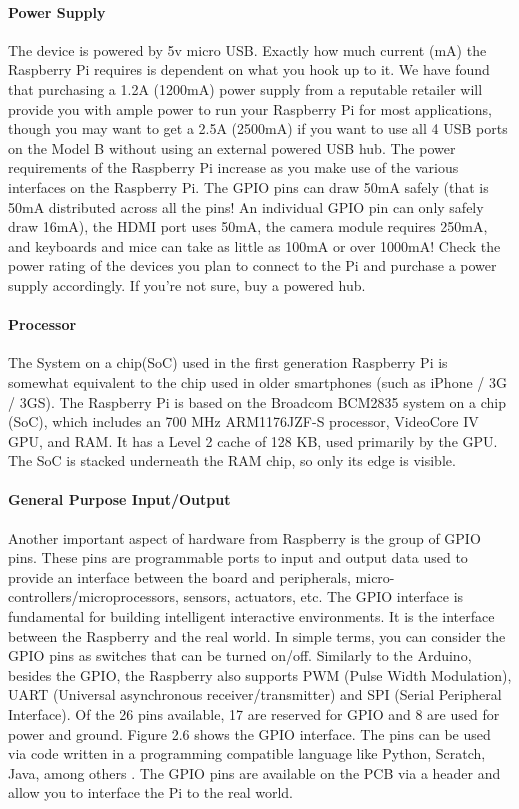\documentclass{acm_proc_article-sp}
\begin{document}
\paragraph{Power Supply}
The device is powered by 5v micro USB. Exactly how much current (mA) the Raspberry Pi requires is dependent on what you hook up to it. We have found that purchasing a 1.2A (1200mA) power supply from a reputable retailer will provide you with ample power to run your Raspberry Pi for most applications, though you may want to get a 2.5A (2500mA) if you want to use all 4 USB ports on the Model B without using an external powered USB hub.
\newline
\newline
The power requirements of the Raspberry Pi increase as you make use of the various interfaces on the Raspberry Pi. The GPIO pins can draw 50mA safely (that is 50mA distributed across all the pins! An individual GPIO pin can only safely draw 16mA), the HDMI port uses 50mA, the camera module requires 250mA, and keyboards and mice can take as little as 100mA or over 1000mA! Check the power rating of the devices you plan to connect to the Pi and purchase a power supply accordingly. If you’re not sure, buy a powered hub.

\paragraph{Processor}
The System on a chip(SoC) used in the first generation Raspberry Pi is somewhat equivalent to the chip used in older smartphones (such as iPhone / 3G / 3GS). The Raspberry Pi is based on the Broadcom BCM2835 system on a chip (SoC)\cite{Broadcom}, which includes an 700 MHz ARM1176JZF-S processor, VideoCore IV GPU\cite{Brose}, and RAM. It has a Level 2 cache of 128 KB, used primarily by the GPU. The SoC is stacked underneath the RAM chip, so only its edge is visible.

\paragraph{General Purpose Input/Output}
Another important aspect of hardware from Raspberry is the group of GPIO pins. These pins are programmable ports to input and output data used to provide an interface between the board and peripherals, micro-controllers/microprocessors, sensors, actuators, etc. The GPIO interface is fundamental for building intelligent interactive environments. It is the interface between the Raspberry and the real world. In simple terms, you can consider the GPIO pins as switches that can be turned on/off.
\newline
\newline
Similarly to the Arduino, besides the GPIO, the Raspberry also supports PWM (Pulse Width Modulation), UART (Universal asynchronous receiver/transmitter) and SPI (Serial Peripheral Interface). Of the 26 pins available, 17 are reserved for GPIO and 8 are used for power and ground. Figure 2.6 shows the GPIO interface. The pins can be used via code written in a programming compatible language like Python, Scratch, Java, among others \cite{Brose}.
The GPIO pins are available on the PCB via a header and allow you to interface the Pi to the real world.
\end{document}
